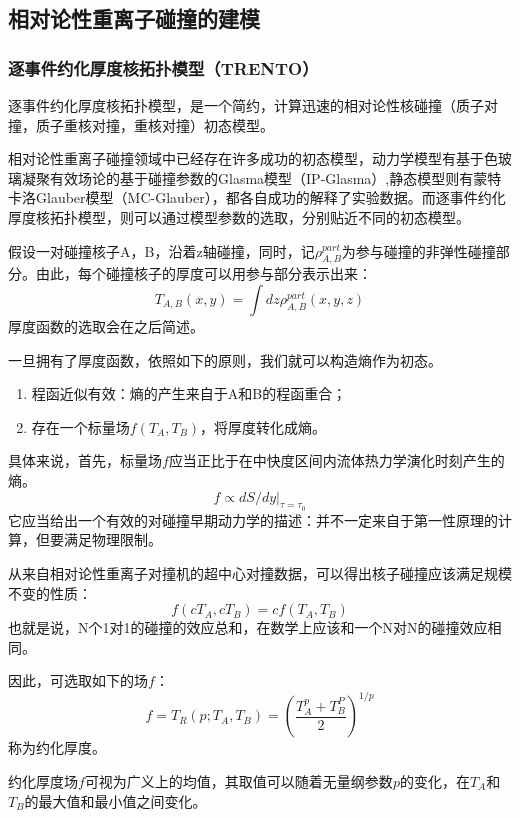 \documentclass[aps,pre,12pt,preprint,onecolumn,showpacs,showkeys]{revtex4-1}
\begin{document}
\subsection{相对论性重离子碰撞的建模}
\subsubsection{逐事件约化厚度核拓扑模型（TRENTO）}
逐事件约化厚度核拓扑模型，是一个简约，计算迅速的相对论性核碰撞（质子对撞，质子重核对撞，重核对撞）初态模型。
\par
相对论性重离子碰撞领域中已经存在许多成功的初态模型，动力学模型有基于色玻璃凝聚有效场论的基于碰撞参数的Glasma模型（IP-Glasma）,静态模型则有蒙特卡洛Glauber模型（MC-Glauber），都各自成功的解释了实验数据。而逐事件约化厚度核拓扑模型，则可以通过模型参数的选取，分别贴近不同的初态模型。
\par
假设一对碰撞核子A，B，沿着z轴碰撞，同时，记$\rho_{A,B}^{part}$为参与碰撞的非弹性碰撞部分。由此，每个碰撞核子的厚度可以用参与部分表示出来：
\begin{equation}
    T_{A,B}(x,y)=\int dz \rho_{A,B}^{part}(x,y,z)
\end{equation}
厚度函数的选取会在之后简述。\par
一旦拥有了厚度函数，依照如下的原则，我们就可以构造熵作为初态。
\begin{enumerate}
    \item 程函近似有效：熵的产生来自于A和B的程函重合；
    \item 存在一个标量场$f(T_A,T_B)$，将厚度转化成熵。
\end{enumerate}
具体来说，首先，标量场$f$应当正比于在中快度区间内流体热力学演化时刻产生的熵。
\begin{equation}
    f\propto dS/dy|_{\tau=\tau_0}
\end{equation}
它应当给出一个有效的对碰撞早期动力学的描述：并不一定来自于第一性原理的计算，但要满足物理限制。
\par
从来自相对论性重离子对撞机的超中心对撞数据，可以得出核子碰撞应该满足规模不变的性质：
\begin{equation}
    f(cT_A,cT_B)=cf(T_A,T_B)
\end{equation}
也就是说，N个1对1的碰撞的效应总和，在数学上应该和一个N对N的碰撞效应相同。\par
因此，可选取如下的场$f$：
\begin{equation}
    f=T_R(p;T_A,T_B)=(\frac{T^p_A+T^P_B}{2})^{1/p}
\end{equation}
称为约化厚度。\par
约化厚度场$f$可视为广义上的均值，其取值可以随着无量纲参数$p$的变化，在$T_A$和$T_B$的最大值和最小值之间变化。
\end{document}

